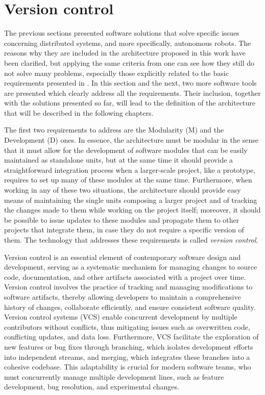 \section{Version control}
\label{sec:version_control}
The previous sections presented software solutions that solve specific issues concerning distributed systems, and more specifically, autonomous robots. The reasons why they are included in the architecture proposed in this work have been clarified, but applying the same criteria from  one can see how they still do not solve many problems, especially those explicitly related to the basic requirements presented in . In this section and the next, two more software tools are presented which clearly address all the requirements. Their inclusion, together with the solutions presented so far, will lead to the definition of the architecture that will be described in the following chapters.

The first two requirements to address are the Modularity (M) and the Development (D) ones. In essence, the architecture must be modular in the sense that it must allow for the development of software modules that can be easily maintained as standalone units, but at the same time it should provide a straightforward integration process when a larger-scale project, like a prototype, requires to set up many of these modules at the same time. Furthermore, when working in any of these two situations, the architecture should provide easy means of maintaining the single units composing a larger project and of tracking the changes made to them while working on the project itself; moreover, it should be possible to issue updates to these modules and propagate them to other projects that integrate them, in case they do not require a specific version of them. The technology that addresses these requirements is called \emph{version control}.

Version control \cite{zolkifli_version_2018} is an essential element of contemporary software design and development, serving as a systematic mechanism for managing changes to source code, documentation, and other artifacts associated with a project over time. Version control involves the practice of tracking and managing modifications to software artifacts, thereby allowing developers to maintain a comprehensive history of changes, collaborate efficiently, and ensure consistent software quality. Version control systems (VCS) enable concurrent development by multiple contributors without conflicts, thus mitigating issues such as overwritten code, conflicting updates, and data loss. Furthermore, VCS facilitate the exploration of new features or bug fixes through branching, which isolates development efforts into independent streams, and merging, which integrates these branches into a cohesive codebase. This adaptability is crucial for modern software teams, who must concurrently manage multiple development lines, such as feature development, bug resolution, and experimental changes.

